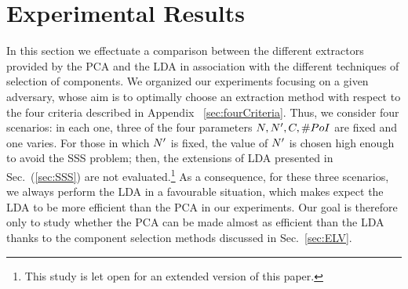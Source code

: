 \section{Experimental Results}\label{sec:experiments}

In this section we effectuate a comparison between the different extractors provided by the PCA and the LDA in association with the different techniques of selection of components. We organized our experiments focusing on a given adversary, whose aim is to optimally choose an extraction method with respect to the four criteria described in Appendix ~\ref{sec:fourCriteria}. Thus, we consider four scenarios: in each one, three of the four parameters $\numTraces[], \numTraces[]', \newTraceLength, \numPoI$ are fixed and one varies. For those in which $\numTraces[]'$ is fixed, the value of $\numTraces[]'$ is chosen high enough to avoid the SSS problem; then, the extensions of LDA presented in Sec.~(\ref{sec:SSS}) are not evaluated.\footnote{This study is let open for an extended version of this paper.} As a consequence, for these three scenarios, we always perform the LDA in a favourable situation, which makes expect the LDA to be more efficient than the PCA in our experiments. Our goal is therefore only to study whether the PCA can be made almost as efficient than the LDA thanks to the component selection methods discussed in Sec.~\ref{sec:ELV}. 



